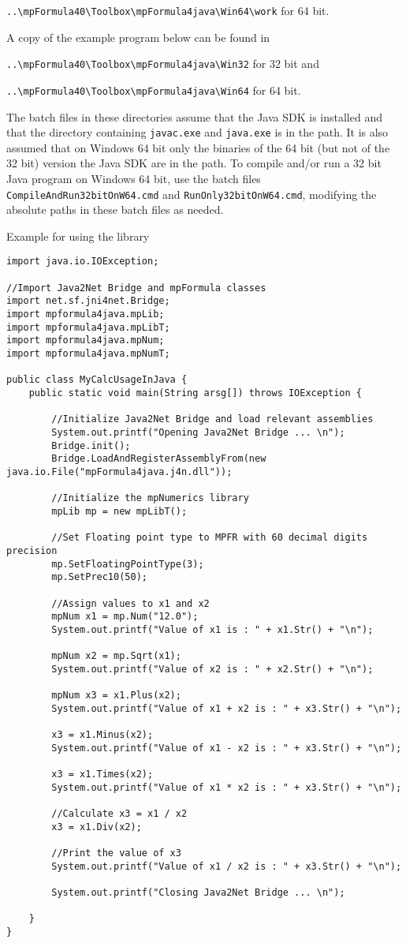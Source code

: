 \verb|..\mpFormula40\Toolbox\mpFormula4java\Win64\work| for 64 bit.

\vpara
A copy of the example program below can be found in 

\verb|..\mpFormula40\Toolbox\mpFormula4java\Win32| for 32 bit and 

\verb|..\mpFormula40\Toolbox\mpFormula4java\Win64| for 64 bit.

\vpara
The batch files in these directories assume that the Java SDK is installed and that the directory containing \verb|javac.exe| and \verb|java.exe| is in the path. It is also assumed that on Windows 64 bit only the binaries of the 64 bit (but not of the 32 bit) version the Java SDK are in the path. To compile and/or run a 32 bit Java program on Windows 64 bit, use the batch files \verb|CompileAndRun32bitOnW64.cmd| and \verb|RunOnly32bitOnW64.cmd|, modifying the absolute paths in these batch files as needed.

\vpara
Example for using the library

\begin{lstlisting}
import java.io.IOException;

//Import Java2Net Bridge and mpFormula classes
import net.sf.jni4net.Bridge;
import mpformula4java.mpLib;
import mpformula4java.mpLibT;
import mpformula4java.mpNum;
import mpformula4java.mpNumT;

public class MyCalcUsageInJava {
	public static void main(String arsg[]) throws IOException {
		
		//Initialize Java2Net Bridge and load relevant assemblies
		System.out.printf("Opening Java2Net Bridge ... \n");
		Bridge.init();
		Bridge.LoadAndRegisterAssemblyFrom(new java.io.File("mpFormula4java.j4n.dll"));

		//Initialize the mpNumerics library
		mpLib mp = new mpLibT();
 
		//Set Floating point type to MPFR with 60 decimal digits precision
		mp.SetFloatingPointType(3);
		mp.SetPrec10(50);

		//Assign values to x1 and x2
		mpNum x1 = mp.Num("12.0");
		System.out.printf("Value of x1 is : " + x1.Str() + "\n");

		mpNum x2 = mp.Sqrt(x1);
		System.out.printf("Value of x2 is : " + x2.Str() + "\n");

		mpNum x3 = x1.Plus(x2);
		System.out.printf("Value of x1 + x2 is : " + x3.Str() + "\n");
		
		x3 = x1.Minus(x2);
		System.out.printf("Value of x1 - x2 is : " + x3.Str() + "\n");
		
		x3 = x1.Times(x2);
		System.out.printf("Value of x1 * x2 is : " + x3.Str() + "\n");
		
		//Calculate x3 = x1 / x2
		x3 = x1.Div(x2);
		
		//Print the value of x3
		System.out.printf("Value of x1 / x2 is : " + x3.Str() + "\n");

		System.out.printf("Closing Java2Net Bridge ... \n");

	}
}
\end{lstlisting}





